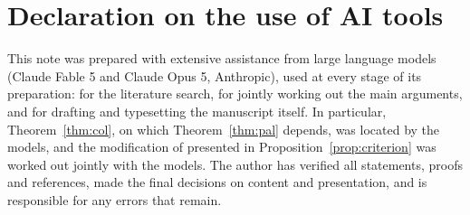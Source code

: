 \documentclass[11pt,a4paper]{article}
\theoremstyle{plain}
\theoremstyle{definition}
\numberwithin{equation}{section}
\begin{document}
\section*{Declaration on the use of AI tools}

This note was prepared with extensive assistance from large language models
(Claude Fable 5 and Claude Opus 5, Anthropic), used at every stage of its preparation: for the
literature search, for jointly working out the main arguments, and for drafting and typesetting the
manuscript itself. In particular,
Theorem~\ref{thm:col}, on which Theorem~\ref{thm:pal} depends, was located by
the models, and the modification of \cite[Prop.~3]{GS} presented in
Proposition~\ref{prop:criterion} was worked out jointly with the models. The
author has verified all statements, proofs and references, made the final
decisions on content and presentation, and is responsible for any errors that
remain.
\end{document}

